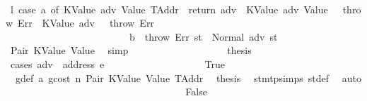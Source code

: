 \begin{isabellebody}
\ \isamarkupfalse%
\ l{}{\isacharcolon}{\kern0pt}\ {\isachardoublequoteopen}{\isacharparenleft}{\kern0pt}case\ a{}\ of\ {\isacharparenleft}{\kern0pt}KValue\ adv{\isacharcomma}{\kern0pt}\ Value\ TAddr{\isacharparenright}{\kern0pt}\ {\isasymRightarrow}\ return\ adv\ {\isacharbar}{\kern0pt}\ {\isacharparenleft}{\kern0pt}KValue\ adv{\isacharcomma}{\kern0pt}\ Value\ {\isacharunderscore}{\kern0pt}{\isacharparenright}{\kern0pt}\ {\isasymRightarrow}\ throw\ Err\ {\isacharbar}{\kern0pt}\ {\isacharparenleft}{\kern0pt}KValue\ adv{\isacharcomma}{\kern0pt}\ {\isacharunderscore}{\kern0pt}{\isacharparenright}{\kern0pt}\ {\isasymRightarrow}\ throw\ Err\isanewline
\ \ \ \ \ \ \ \ \ \ \ \ \ \ \ \ \ \ \ \ \ \ \ {\isacharbar}{\kern0pt}\ {\isacharparenleft}{\kern0pt}{\isacharunderscore}{\kern0pt}{\isacharcomma}{\kern0pt}\ b{\isacharparenright}{\kern0pt}\ {\isasymRightarrow}\ throw\ Err{\isacharparenright}{\kern0pt}\ st{\isacharprime}{\kern0pt}{\isacharprime}{\kern0pt}\ {\isacharequal}{\kern0pt}\ Normal\ {\isacharparenleft}{\kern0pt}adv{\isacharcomma}{\kern0pt}\ st{\isacharprime}{\kern0pt}{\isacharprime}{\kern0pt}{\isacharparenright}{\kern0pt}{\isachardoublequoteclose}\ \isamarkupfalse%
\ Pair\ KValue\ Value\ \isamarkupfalse%
\ simp\isanewline
\ \ \ \ \ \ \ \ \ \ \ \ \ \ \ \ \isamarkupfalse%
\ \isamarkupfalse%
\ {\isacharquery}{\kern0pt}thesis\isanewline
\ \ \ \ \ \ \ \ \ \ \ \ \ \ \ \ \isamarkupfalse%
\ {\isacharparenleft}{\kern0pt}cases\ {\isachardoublequoteopen}adv\ {\isacharequal}{\kern0pt}\ address\ e{\isachardoublequoteclose}{\isacharparenright}{\kern0pt}\isanewline
\ \ \ \ \ \ \ \ \ \ \ \ \ \ \ \ \ \ \isamarkupfalse%
\ True\isanewline
\ \ \ \ \ \ \ \ \ \ \ \ \ \ \ \ \ \ \isamarkupfalse%
\ {}{\isacharparenleft}{\kern0pt}{}{\isacharparenright}{\kern0pt}\ g{\isacharunderscore}{\kern0pt}def\ a{}\ gcost\ n\ Pair\ KValue\ Value\ TAddr\ \isamarkupfalse%
\ {\isacharquery}{\kern0pt}thesis\ \isamarkupfalse%
\ stmt{\isachardot}{\kern0pt}psimps{\isacharparenleft}{\kern0pt}{}{\isacharparenright}{\kern0pt}\ st{\isacharprime}{\kern0pt}{\isacharunderscore}{\kern0pt}def\ \isamarkupfalse%
\ auto\isanewline
\ \ \ \ \ \ \ \ \ \ \ \ \ \ \ \ \isamarkupfalse%
\isanewline
\ \ \ \ \ \ \ \ \ \ \ \ \ \ \ \ \ \ \isamarkupfalse%
\ False\isanewline
\ \ \ \ \ \ \ \ \ \ \ \ \ \ \ \ \ \ \isamarkupfalse%

\end{isabellebody}

